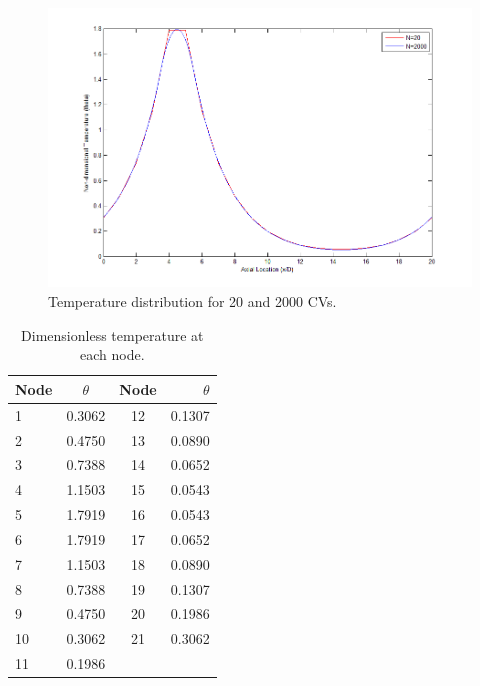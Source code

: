 \documentclass[letterpaper]{article}
\begin{document}
\begin{figure}[b]
\centerline{\includegraphics[width=1.5\textwidth]{N20-2000.png}}
\caption{\label{fig:graph}Temperature distribution for 20 and 2000 CVs.}
\end{figure}

\begin{table}
\centering
\begin{tabular}{l|c|c|r}
	Node & $\theta$ & Node & $\theta$\\
	\hline
	1	& 0.3062 & 12  & 0.1307\\
	2   & 0.4750 & 13  & 0.0890\\
	3   & 0.7388 & 14  & 0.0652\\
	4   & 1.1503 & 15  & 0.0543\\
	5   & 1.7919 & 16  & 0.0543\\
	6   & 1.7919 & 17  & 0.0652\\
	7   & 1.1503 & 18  & 0.0890\\
	8   & 0.7388 & 19  & 0.1307\\
	9   & 0.4750 & 20  & 0.1986\\
	10  & 0.3062 & 21  & 0.3062\\
	11  & 0.1986\\
\end{tabular}
\caption{\label{fig:ResultTable}Dimensionless temperature at each node.}
\end{table}    
\end{document}
